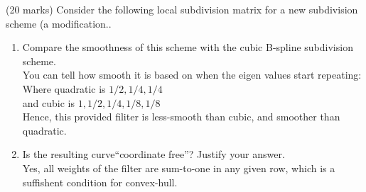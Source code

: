 (20 marks) Consider the following local subdivision matrix for a new subdivision scheme (a modification.. \\

\begin{enumerate}
\item Compare the smoothness of this scheme with the cubic B-spline subdivision scheme. \\
You can tell how smooth it is based on when the eigen values start repeating: \\
Where quadratic is $1/2, 1/4, 1/4$ \\
and cubic is $1, 1/2, 1/4, 1/8, 1/8$ \\
Hence, this provided filiter is less-smooth than cubic, and smoother than quadratic. \\
\item Is the resulting curve“coordinate free”? Justify your answer. \\
Yes, all weights of the filter are sum-to-one in any given row, which is a suffishent condition for convex-hull. \\
\end{enumerate}
